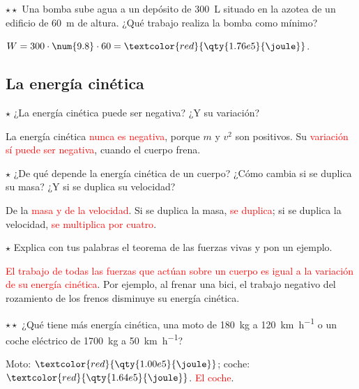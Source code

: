 \begin{exercise}
    \(\star\star\) Una bomba sube agua a un depósito de \qty{300}{\liter} situado en la azotea de un edificio de \qty{60}{\m} de altura.
    ¿Qué trabajo realiza la bomba como mínimo?
    \begin{solu}
        \(W = 300 \cdot \num{9.8} \cdot 60 = \textcolor{red}{\qty{1.76e5}{\joule}}\).
    \end{solu}
\end{exercise}

\subsection{La energía cinética}

\begin{exercise}
    \(\star\) ¿La energía cinética puede ser negativa? ¿Y su variación?
    \begin{solu}
        La energía cinética \textcolor{red}{nunca es negativa}, porque \(m\) y \(v^2\) son positivos. Su \textcolor{red}{variación sí
        puede ser negativa}, cuando el cuerpo frena.
    \end{solu}
\end{exercise}

\begin{exercise}
    \(\star\) ¿De qué depende la energía cinética de un cuerpo? ¿Cómo cambia si se duplica su masa? ¿Y si se duplica su velocidad?
    \begin{solu}
        De la \textcolor{red}{masa y de la velocidad}. Si se duplica la masa, \textcolor{red}{se duplica}; si se duplica la velocidad,
        \textcolor{red}{se multiplica por cuatro}.
    \end{solu}
\end{exercise}

\begin{exercise}
    \(\star\) Explica con tus palabras el teorema de las fuerzas vivas y pon un ejemplo.
    \begin{solu}
        \textcolor{red}{El trabajo de todas las fuerzas que actúan sobre un cuerpo es igual a la variación de su energía cinética}. Por
        ejemplo, al frenar una bici, el trabajo negativo del rozamiento de los frenos disminuye su energía cinética.
    \end{solu}
\end{exercise}

\begin{exercise}
    \(\star\star\) ¿Qué tiene más energía cinética, una moto de \qty{180}{\kg} a \qty{120}{\km\per\hour} o un coche eléctrico de
    \qty{1700}{\kg} a \qty{50}{\km\per\hour}?
    \begin{solu}
        Moto: \(\textcolor{red}{\qty{1.00e5}{\joule}}\); coche: \(\textcolor{red}{\qty{1.64e5}{\joule}}\). \textcolor{red}{El coche}.
    \end{solu}
\end{exercise}

